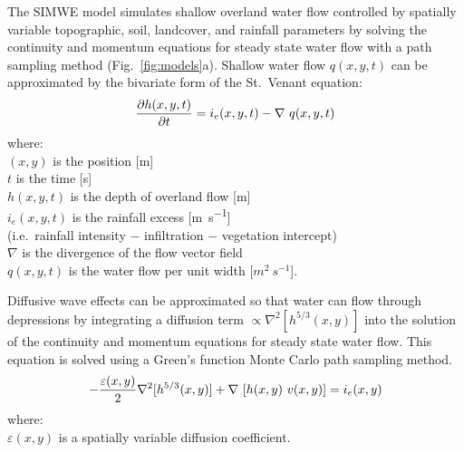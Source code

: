 \documentclass[gmd, manuscript]{copernicus}
\begin{document}
The SIMWE model
simulates shallow overland water flow
controlled by spatially variable topographic, soil, landcover, and rainfall parameters
by solving the continuity and momentum equations 
for steady state water flow with a path sampling method
(Fig.~\ref{fig:models}a). 
Shallow water flow $q(x,y,t)$ can be approximated by
the bivariate form of the St.~Venant equation:
\begin{equation}
\label{eq:water}
{\partial h(x,y,t) \over \partial t} =
 i_e(x,y,t) - \nabla ~ q(x,y,t)
\end{equation}
{\small
\noindent
where: \\
\noindent
\hspace*{0.5em} $(x,y)$ is the position [\unit{m}]\\
\hspace*{0.5em} $t$ is the time [\unit{s}] \\
\hspace*{0.5em} $h(x,y,t)$ is the depth of overland flow [\unit{m}]\\
\hspace*{0.5em} $i_e(x,y,t)$ is the rainfall excess [\unit{m~s^{-1}}] \\
\hspace*{0.5em} (i.e.~rainfall intensity $-$ infiltration $-$ vegetation intercept)\\
\hspace*{0.5em} $\nabla$ is the divergence of the flow vector field\\
\hspace*{0.5em} $q(x,y,t)$ is the water flow per unit width [$\unit{m}^2~\unit{s}^{-1}$]. \\
}

\noindent
Diffusive wave effects can be approximated
so that water can flow through depressions 
by integrating a diffusion term $ \propto \nabla^2 [h^{5/3}(x,y)]$ 
into the solution of the continuity and momentum equations 
for steady state water flow.
This equation is solved using a 
Green's function Monte Carlo path sampling method. 
\begin{equation}
\label{eq:difwater}
-{\varepsilon(x,y)\over 2 }\nabla^2 [h^{5/3}(x,y)]
+\nabla ~ [ h(x,y)~v(x,y)] = i_e(x,y)
\end{equation}
{\small
\noindent
 where: \\
 \noindent
 \hspace*{0.5em} $\varepsilon(x,y)$ is a spatially variable diffusion coefficient. \\
}
\end{document}
